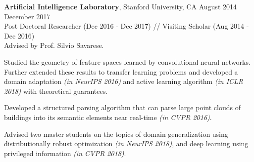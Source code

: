  \textbf{Artificial Intelligence Laboratory}, Stanford University, CA \hfill August 2014 \textendash ~ December 2017 \vspace{0.5mm}\\\vspace{0mm} 
  \hspace{-1.5mm}  Post Doctoral Researcher (Dec 2016 - Dec 2017) // Visiting Scholar (Aug 2014 - Dec 2016)  \hfill \vspace{1mm} \\
 Advised by Prof. Silvio Savarese.

Studied the geometry of feature spaces learned by convolutional neural networks. Further extended these results to transfer learning problems and developed a domain adaptation \emph{(in NeurIPS 2016)} and active learning algorithm \emph{(in ICLR 2018)} with theoretical guarantees. 
 
 \ifx\researchtyperesume\undefined
\else
\newpage
\fi

 \ifx\academictyperesume\undefined
\else
\newpage
\fi


Developed a structured parsing algorithm that can parse large point clouds of buildings into its semantic elements near real-time \emph{(in CVPR 2016)}.

Advised two master students on the topics of domain generalization using distributionally robust optimization \emph{(in NeurIPS 2018)}, and deep learning using privileged information \emph{(in CVPR 2018)}. 
